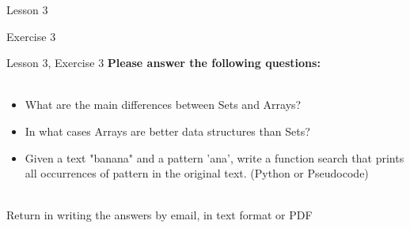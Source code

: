\documentclass[aspectratio=1610]{beamer}
\begin{document}
\begin{frame}{Lesson 3}{}
\begin{center}
\Huge Exercise 3
\end{center}
\end{frame}

\begin{frame}{Lesson 3, Exercise 3}{}
\Large
\textbf{Please answer the following questions:}\\~\\ 

\Large{
\begin{itemize}
	\item What are the main differences between Sets and Arrays?
	\item In what cases Arrays are better data structures than Sets?
	\item Given a text "banana" and a pattern 'ana', write a function search that prints all occurrences of pattern in the original text. (Python or Pseudocode)\\~\\
\end{itemize}}

Return in writing the answers by email, in text format or PDF
\end{frame}
\end{document}
